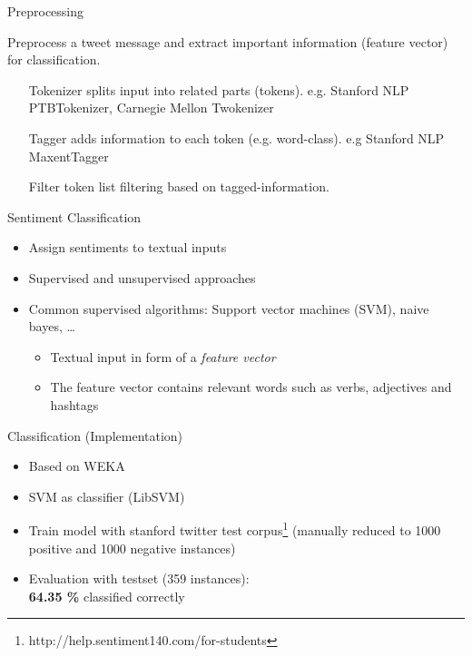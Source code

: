 \documentclass{beamer}
\begin{document}
\begin{frame}{Preprocessing}
\begin{block}{}
Preprocess a tweet message and extract important information (feature vector) for classification.
\end{block}
\begin{itemize}
	\item[Tokenizer]
    splits input into related parts (tokens). e.g. Stanford NLP PTBTokenizer, Carnegie Mellon Twokenizer
	\item[Tagger]
    adds information to each token (e.g. word-class).  e.g Stanford NLP MaxentTagger
	\item[Filter token list] 
    filtering based on tagged-information. 
\end{itemize}


\end{frame}

\begin{frame}{Sentiment Classification}
\begin{itemize}
	\item Assign sentiments to textual inputs
    \item Supervised and unsupervised approaches
    \item Common supervised algorithms: Support vector machines (SVM), naive bayes, \ldots
    \begin{itemize}
        \item Textual input in form of a \emph{feature vector}
        \item The feature vector contains relevant words such as verbs, adjectives and hashtags
    \end{itemize}
\end{itemize}
\end{frame}


\begin{frame}{Classification (Implementation)}
\begin{itemize}
	\item Based on WEKA
    \item SVM as classifier (LibSVM)
    \item Train model with stanford twitter test corpus\footnote{\tiny{http://help.sentiment140.com/for-students}} (manually reduced to 1000 positive and 1000 negative instances)
	\item Evaluation with testset (359 instances):\\ \textbf{64.35 \%} classified correctly
\end{itemize}
\end{frame}
\end{document}
